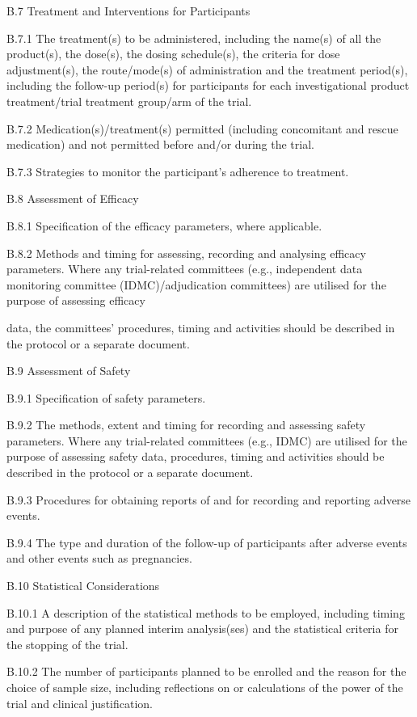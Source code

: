 \documentclass[11pt]{article}
\begin{document}
B.7 Treatment and Interventions for Participants


B.7.1 The treatment(s) to be administered, including the name(s) of all the product(s), the dose(s), the dosing schedule(s), the criteria for dose adjustment(s), the route/mode(s) of administration and the treatment period(s), including the follow-up period(s) for participants for each investigational product treatment/trial treatment group/arm of the trial.


B.7.2 Medication(s)/treatment(s) permitted (including concomitant and rescue medication) and not permitted before and/or during the trial.


B.7.3 Strategies to monitor the participant's adherence to treatment.


B.8 Assessment of Efficacy


B.8.1 Specification of the efficacy parameters, where applicable.


B.8.2 Methods and timing for assessing, recording and analysing efficacy parameters. Where any trial-related committees (e.g., independent data monitoring committee (IDMC)/adjudication committees) are utilised for the purpose of assessing efficacy


data, the committees' procedures, timing and activities should be described in the protocol or a separate document.


B.9 Assessment of Safety


B.9.1 Specification of safety parameters.


B.9.2 The methods, extent and timing for recording and assessing safety parameters. Where any trial-related committees (e.g., IDMC) are utilised for the purpose of assessing safety data, procedures, timing and activities should be described in the protocol or a separate document.


B.9.3 Procedures for obtaining reports of and for recording and reporting adverse events.


B.9.4 The type and duration of the follow-up of participants after adverse events and other events such as pregnancies.


B.10 Statistical Considerations


B.10.1 A description of the statistical methods to be employed, including timing and purpose of any planned interim analysis(ses) and the statistical criteria for the stopping of the trial.


B.10.2 The number of participants planned to be enrolled and the reason for the choice of sample size, including reflections on or calculations of the power of the trial and clinical justification.
\end{document}
